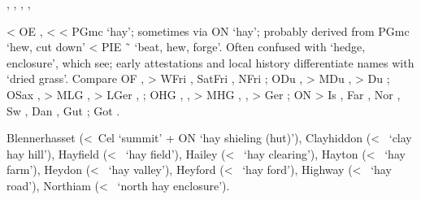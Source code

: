 \documentclass[12pt,letterpaper,oneside,article,draft]{memoir}
\begin{document}
\begin{Lemma}
\begin{Also}
	, , , , 
\end{Also}
\begin{Etymology}
	< OE ,  <  < PGmc  ‘hay’;
		sometimes via ON  ‘hay’;
		probably derived from PGmc  ‘hew, cut down’
		< PIE  \~\  ‘beat, hew, forge’.
	Often confused with  ‘hedge, enclosure’, which see;
		early attestations and local history differentiate names with  ‘dried grass’.
	Compare
	OF ,  > WFri , SatFri , NFri ;
	ODu ,  > MDu ,  > Du ;
	OSax ,  > MLG ,  > LGer , ;
	OHG , ,  > MHG , ,  > Ger ;
	ON  > Is , Far , Nor , Sw , Dan , Gut ;
	Got  .
\end{Etymology}
\begin{Examples}
	Blennerhasset (<~Cel  ‘summit’ + ON  ‘hay shieling (hut)’), Clayhiddon (<~ ‘clay hay hill’), Hayfield (<~ ‘hay field’), Hailey (<~ ‘hay clearing’), Hayton (<~ ‘hay farm’), Heydon (<~ ‘hay valley’), Heyford (<~ ‘hay ford’), Highway (<~ ‘hay road’), Northiam (<~ ‘north hay enclosure’).
\end{Examples}
\end{Lemma}
\end{document}
